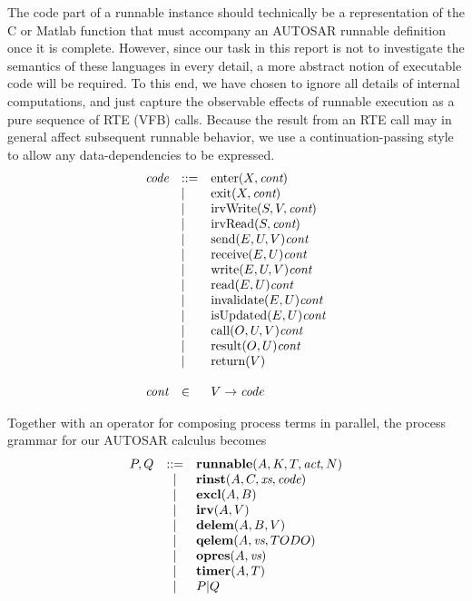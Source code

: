 \documentclass[twocolumn]{article}
\begin{document}
The code part of a runnable instance should technically be a representation of the C or Matlab function that must accompany an AUTOSAR runnable definition once it is complete. However, since our task in this report is not to investigate the semantics of these languages in every detail, a more abstract notion of executable code will be required. To this end, we have chosen to ignore all details of internal computations, and just capture the observable effects of runnable execution as a pure sequence of RTE (VFB) calls. Because the result from an RTE call may in general affect subsequent runnable behavior, we use a continuation-passing style to allow any data-dependencies to be expressed.
$$
\begin{array}{lll}
	\Code	& ::=	& \Enter{X}{\Cont}			\\
			& |	& \Exit{X}{\Cont}			\\
			& |	& \IrvWrite{S}{V}{\Cont}		\\
			& |	& \IrvRead{S}{\Cont}			\\
			& |	& \Send{E}{U}{V}{\Cont}		\\
			& |	& \Receive{E}{U}{\Cont}		\\
			& |	& \Write{E}{U}{V}{\Cont}		\\
			& |	& \Read{E}{U}{\Cont}		\\
			& |	& \Invalidate{E}{U}{\Cont}		\\
			& |	& \IsUpdated{E}{U}{\Cont}		\\
			& |	& \Call{O}{U}{V}{\Cont}		\\
			& |	& \Result{O}{U}{\Cont}		\\
			& |	& \Return{V}				\\
	\\
	\Cont	& \in	& V \rightarrow \Code		\\
\end{array}
$$

Together with an operator for composing process terms in parallel, the process grammar for our AUTOSAR calculus becomes
$$
\begin{array}{rcll}
	P,Q 	& ::= &
		\runnable{A}{K}{T}{\Act}{N}	\\
		& | &
		\rinst{A}{C}{\Xs}{\Code}	\\
		& | &
		\excl{A}{B}			\\
		& | &
		\irv{A}{V}				\\
		& | &
		\delem{A}{B}{V}			\\
		& | &
		\qelem{A}{\Vs}{TODO}			\\
		& | &
		\opres{A}{\Vs}			\\
		& | &
		\timer{A}{T}		\\
		& | &
		P|Q					\\
\end{array}
$$
\end{document}
